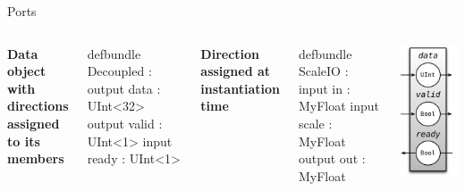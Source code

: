 \documentclass[xcolor=pdflatex,dvipsnames,table]{beamer}
\begin{document}
\begin{frame}[fragile]{Ports}

\begin{columns}

\textbf{Data object with directions assigned to its members}

\begin{stanza}
defbundle Decoupled :
  output data : UInt<32>
  output valid : UInt<1>
  input ready : UInt<1>
\end{stanza}

\textbf{Direction assigned at instantiation time}

\begin{stanza}
defbundle ScaleIO :
  input in : MyFloat
  input scale : MyFloat
  output out : MyFloat
\end{stanza}


\begin{center}
\includegraphics[height=0.9\textheight]{figs/FIFOIO.pdf} 
\end{center}

\end{columns}

\end{frame}
\end{document}
